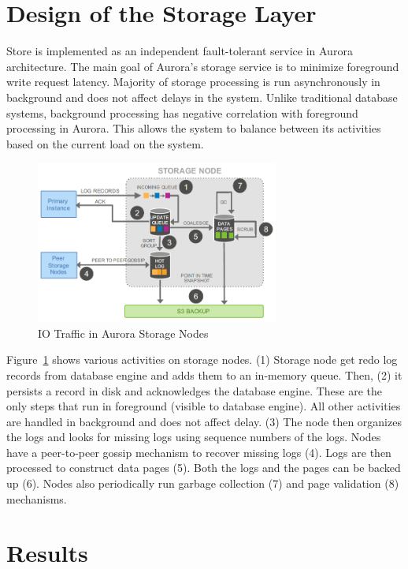 \documentclass[conference]{IEEEtran}
\begin{document}
\section{Design of the Storage Layer}
Store is implemented as an independent fault-tolerant service in Aurora architecture. The main goal of Aurora's storage service is to minimize foreground write request latency. Majority of storage processing is run asynchronously in background and does not affect delays in the system. Unlike traditional database systems, background processing has negative correlation with foreground processing in Aurora. This allows the system to balance between its activities based on the current load on the system. 

\begin{figure}[!htb]
    \centering
    \includegraphics[width=8cm]{../images/storage_node.png}
    \caption{IO Traffic in Aurora Storage Nodes}
    \label{aurora_storage}
\end{figure}

Figure~\ref{aurora_storage} shows various activities on storage nodes. (1) Storage node get redo log records from database engine and adds them to an in-memory queue. Then, (2) it persists a record in disk and acknowledges the database engine. These are the only steps that run in foreground (visible to database engine). All other activities are handled in background and does not affect delay. (3) The node then organizes the logs and looks for missing logs using sequence numbers of the logs. Nodes have a peer-to-peer gossip mechanism to recover missing logs (4). Logs are then processed to construct data pages (5). Both the logs and the pages can be backed up (6). Nodes also periodically run garbage collection (7) and page validation (8) mechanisms.

\section{Results}
\end{document}
